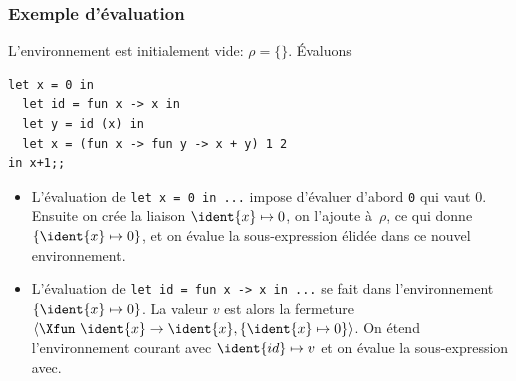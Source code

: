 %
\begin{frame}[containsverbatim]
\frametitle{Exemple d'évaluation}
\label{exemple_eval_informelle}

L'environnement est initialement vide: $\rho = \{\}$. Évaluons
{\small
\begin{verbatim}
let x = 0 in
  let id = fun x -> x in
  let y = id (x) in
  let x = (fun x -> fun y -> x + y) 1 2
in x+1;;
\end{verbatim}
}
\begin{itemize}

  \item L'évaluation de {\small \verb|let x = 0 in ...|} impose
    d'évaluer d'abord \texttt{0} qui vaut $0$. Ensuite on crée la
    liaison $\ident{x} \mapsto 0$, on l'ajoute à~$\rho$, ce qui donne
    $\{\ident{x} \mapsto 0\}$, et on évalue la sous-expression élidée
    dans ce nouvel environnement.

  \item L'évaluation de {\small \verb|let id = fun x -> x in ...|} se
    fait dans l'environnement $\{\ident{x} \mapsto 0\}$. La valeur $v$
    est alors la fermeture $\langle\Xfun \,\, \ident{x} \rightarrow
    \ident{x}, \{\ident{x} \mapsto 0\}\rangle$. On étend
    l'environnement courant avec $\ident{id} \mapsto v$ et on évalue
    la sous-expression avec.

\end{itemize}

\end{frame}

